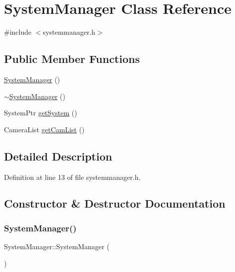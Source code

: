 \hypertarget{class_system_manager}{}\section{System\+Manager Class Reference}
\label{class_system_manager}


{\ttfamily \#include $<$systemmanager.\+h$>$}

\subsection*{Public Member Functions}
\begin{DoxyCompactItemize}
\item 
\mbox{\hyperlink{class_system_manager_a2f8a3e2e1929be50ef8702629f50bb94}{System\+Manager}} ()
\item 
\mbox{\hyperlink{class_system_manager_a0fa2e3c0906401494f6bf4e482aecc0d}{$\sim$\+System\+Manager}} ()
\item 
System\+Ptr \mbox{\hyperlink{class_system_manager_a8299a2453dcf4a6b4e398528ccef6859}{get\+System}} ()
\item 
Camera\+List \mbox{\hyperlink{class_system_manager_af00f9094762037857e2b76b4b2781ec2}{get\+Cam\+List}} ()
\end{DoxyCompactItemize}


\subsection{Detailed Description}


Definition at line 13 of file systemmanager.\+h.



\subsection{Constructor \& Destructor Documentation}
\mbox{\label{class_system_manager_a2f8a3e2e1929be50ef8702629f50bb94}} 
\subsubsection{\texorpdfstring{SystemManager()}{SystemManager()}}
{\footnotesize\ttfamily System\+Manager\+::\+System\+Manager (\begin{DoxyParamCaption}{ }\end{DoxyParamCaption})}



